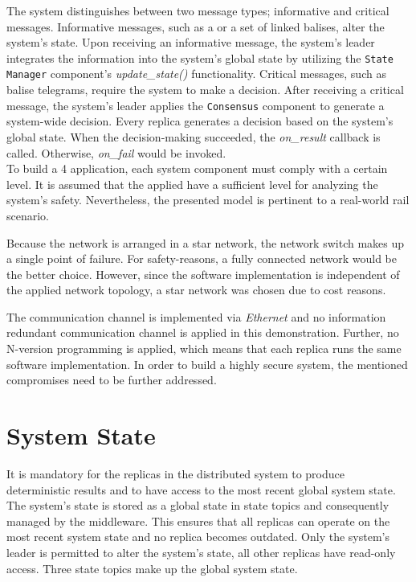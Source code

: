 The system distinguishes between two message types; informative and critical messages.
Informative messages, such as a  or a set of linked balises, alter the system's state.
Upon receiving an informative message, the system's leader integrates the information into the system's global state by utilizing the \texttt{State Manager} component's \textit{update\_state()} functionality.
Critical messages, such as balise telegrams, require the system to make a decision.
After receiving a critical message, the system's leader applies the \texttt{Consensus} component to generate a system-wide decision.
Every replica generates a decision based on the system's global state.
When the decision-making succeeded, the \textit{on\_result} callback is called.
Otherwise, \textit{on\_fail} would be invoked.
\\

To build a  4 application, each system component must comply with a certain  level.
It is assumed that the applied  have a sufficient  level for analyzing the system's safety.
Nevertheless, the presented model is pertinent to a real-world rail scenario.

Because the network is arranged in a star network, the network switch makes up a single point of failure.
For safety-reasons, a fully connected network would be the better choice.
However, since the software implementation is independent of the applied network topology, a star network was chosen due to cost reasons.

The communication channel is implemented via \textit{Ethernet} and no information redundant communication channel is applied in this demonstration.
Further, no N-version programming is applied, which means that each replica runs the same software implementation.
In order to build a highly secure system, the mentioned compromises need to be further addressed.

\section{System State}
\label{sec:stateManager}
It is mandatory for the replicas in the distributed system to produce deterministic results and to have access to the most recent global system state.
The system's state is stored as a global state in  state topics and consequently managed by the middleware.
This ensures that all replicas can operate on the most recent system state and no replica becomes outdated.
Only the system's leader is permitted to alter the system's state, all other replicas have read-only access.
Three  state topics make up the global system state.
\\

